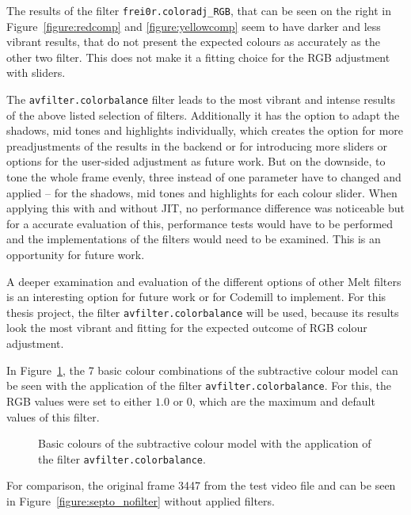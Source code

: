 \documentclass[../MasterThesis.tex]{subfiles}
\begin{document}
The results of the filter \texttt{frei0r.coloradj\_RGB}, that can be seen on the right in Figure~\ref{figure:redcomp} and \ref{figure:yellowcomp} seem to have darker and less vibrant results, that do not present the expected colours as accurately as the other two filter. This does not make it a fitting choice for the RGB adjustment with sliders.


The \texttt{avfilter.colorbalance} filter leads to the most vibrant and intense results of the above listed selection of filters. Additionally it has the option to adapt the shadows, mid tones and highlights individually, which creates the option for more preadjustments of the results in the backend or for introducing more sliders or options for the user-sided adjustment as future work.
But on the downside, to tone the whole frame evenly, three instead of one parameter have to changed and applied -- for the shadows, mid tones and highlights for each colour slider.
When applying this with and without JIT, no performance difference was noticeable but for a accurate evaluation of this, performance tests would have to be performed and the implementations of the filters would need to be examined. This is an opportunity for future work.

A deeper examination and evaluation of the different options of other Melt filters is an interesting option for future work or for Codemill to implement. For this thesis project, the filter \texttt{avfilter.colorbalance} will be used, because its results look the most vibrant and fitting for the expected outcome of RGB colour adjustment.

In Figure~\ref{figure:septopus}, the 7 basic colour combinations of the subtractive colour model can be seen with the application of the filter \texttt{avfilter.colorbalance}. For this, the RGB values were set to either $1.0$ or $0$, which are the maximum and default values of this filter. 



\begin{figure}[H]
	\begin{center}
		\label{figure:septopus}
		\caption[Basic colours with the application of the filter \texttt{avfilter.colorbalance}.]{Basic colours of the subtractive colour model with the application of the filter \texttt{avfilter.colorbalance}.}
	\end{center}
\end{figure}

For comparison, the original frame 3447 from the test video file and can be seen in Figure~\ref{figure:septo_nofilter} without applied filters.
\end{document}
